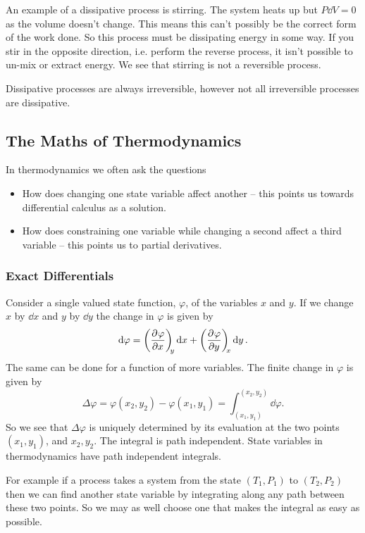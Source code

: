     An example of a dissipative process is stirring.
    The system heats up but \(P\dd{V} = 0\) as the volume doesn't change.
    This means this can't possibly be the correct form of the work done.
    So this process must be dissipating energy in some way.
    If you stir in the opposite direction, i.e. perform the reverse process, it isn't possible to un-mix or extract energy.
    We see that stirring is not a reversible process.
    
    Dissipative processes are always irreversible, however not all irreversible processes are dissipative.
    
    \subsection{The Maths of Thermodynamics}
    In thermodynamics we often ask the questions
    \begin{itemize}
        \item How does changing one state variable affect another -- this points us towards differential calculus as a solution.
        \item How does constraining one variable while changing a second affect a third variable -- this points us to partial derivatives.
    \end{itemize}
    
    \subsubsection{Exact Differentials}
    Consider a single valued state function, \(\varphi\), of the variables \(x\) and \(y\).
    If we change \(x\) by \(\dd{x}\) and \(y\) by \(\dd{y}\) the change in \(\varphi\) is given by
    \[\dd{\varphi} = \left(\pdv[]{\varphi}{x}\right)_{\!\!{y}}\dd{x} + \left(\pdv[]{\varphi}{y}\right)_{\!\!{x}}\dd{y}.\]
    The same can be done for a function of more variables.
    The finite change in \(\varphi\) is given by
    \[\Delta\varphi = \varphi(x_2, y_2) - \varphi(x_1, y_1) = \int_{(x_1, y_1)}^{(x_2, y_2)} \dd{\varphi}.\]
    So we see that \(\Delta\varphi\) is uniquely determined by its evaluation at the two points \((x_1, y_1)\), and \(x_2, y_2\).
    The integral is path independent.
    State variables in thermodynamics have path independent integrals.
    
    For example if a process takes a system from the state \((T_1, P_1)\) to \((T_2, P_2)\) then we can find another state variable by integrating along any path between these two points.
    So we may as well choose one that makes the integral as easy as possible.
    
